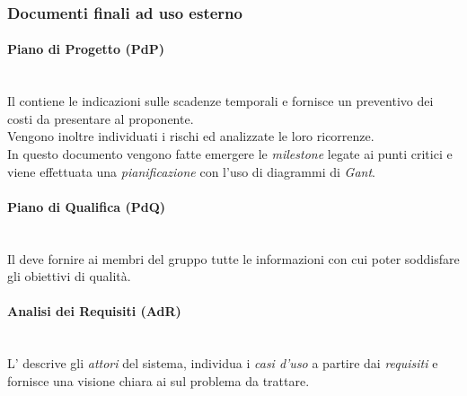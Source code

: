 	\subsubsection{Documenti finali ad uso esterno}
	\paragraph{Piano di Progetto (PdP)}
	~\\Il \PdP{} contiene le indicazioni sulle scadenze temporali e fornisce un preventivo dei costi da presentare al proponente. 
	~\\Vengono inoltre individuati i rischi ed analizzate le loro ricorrenze.
	~\\In questo documento vengono fatte emergere le \emph{milestone} legate ai punti critici e viene effettuata una \emph{pianificazione} con l'uso di diagrammi di \emph{Gant}.
	\paragraph{Piano di Qualifica (PdQ)} 
	~\\Il \PdQ{} deve fornire ai membri del gruppo tutte le informazioni con cui poter soddisfare gli obiettivi di qualità.
	\paragraph{Analisi dei Requisiti (AdR)}
	~\\L'\AdR{} descrive gli \emph{attori} del sistema, individua i \emph{casi d'uso} a partire dai \emph{requisiti} e fornisce una visione chiara ai \progs{} sul problema da trattare.
	
	\begin{comment}
	\paragraph{Specifica Tecnica (ST)}
	~\\La \ST{} si occupa di dare una descrizione ad alto livello del prodotto, descrivendo pregi e difetti delle sue tecnologie. \textcolor{red}{Da ampliare quando avremo fatto il documento}
	\paragraph{Definizione di Prodotto (DdP)}
	~\\La \DdP{} descrive i dettagli implementativi del prodotto, andando a definire anche le funzioni delle componenti terminali del sistema tramite diagrammi \emph{UML}.
	\end{comment}
	
